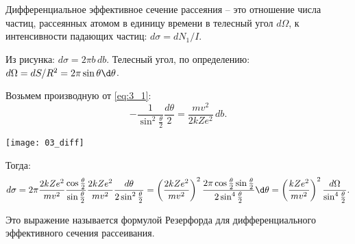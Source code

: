 \begin{minipage}{.55\textwidth}
Дифференциальное эффективное сечение рассеяния -- это отношение числа частиц,
рассеянных атомом в единицу времени в телесный угол \( d\Omega \), к
интенсивности падающих частиц: \( d\sigma = dN_1/I \).

Из рисунка: \( d\sigma = 2\pi b\,db \). Телесный угол, по определению:
\( d\Omega = dS/R^2 = 2\pi\sin\theta\d\theta \).

Возьмем производную от \eqref{eq:3_1}:
\[
    -\frac{1}{\sin^2\frac{\theta}{2}}\frac{d\theta}{2} = \frac{mv^2}{2kZe^2}\,db.
\]
\end{minipage}
\begin{minipage}{.4\textwidth}
    \texttt{[image: 03\_diff]}
\end{minipage}
Тогда:
\[
    d\sigma = 2\pi\frac{2kZe^2}{mv^2}\frac{\cos\frac{\theta}{2}}{\sin\frac
    {\theta}{2}}\frac{2kZe^2}{mv^2}\frac{d\theta}{2\sin^2\frac{\theta}{2}} =
    \left( \frac{2kZe^2}{mv^2} \right)^2 \frac{2\pi\cos\frac{\theta}{2}\sin
    \frac{\theta}{2}}{2\sin^4\frac{\theta}{2}}\d\theta = \left( \frac{kZe^2}
    {mv^2} \right)^2 \frac{d\Omega}{\sin^4\frac{\theta}{2}}.
\]

Это выражение называется формулой Резерфорда для дифференциального эффективного
сечения рассеивания.

\newpage
